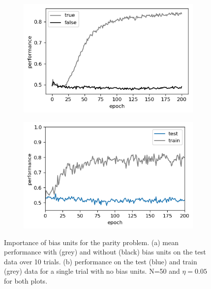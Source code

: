 \documentclass{article}
\begin{document}
\begin{figure}[h]
	\centering
	\begin{subfigure}[t]{0.42\linewidth}
		\centering
		\includegraphics[width = 1.0\linewidth, trim={0 0 0 0}, clip=true]{figures/bias_parity.png}
	\end{subfigure}%
	\hspace{0.02 \linewidth}
	\begin{subfigure}[t]{0.42\linewidth}
		\centering
		\includegraphics[width = 1.0\linewidth, trim={0 0 0 0}, clip=true]{figures/nobias_N50_eta05_nepoch200_transfer_tanh_parity_performance.png}
	\end{subfigure}%
\caption{Importance of bias units for the parity problem. (a) mean performance with (grey) and without (black) bias units on the test data over 10 trials. (b) performance on the test (blue) and train (grey) data for a single trial with no bias units. N=50 and $\eta = 0.05$ for both plots.}
\label{fig:bias_parity}
\end{figure}
\end{document}
